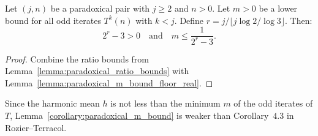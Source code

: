 \begin{corollary}\label{corollary:paradoxical_m_bound}\leanok
Let $(j, n)$ be a paradoxical pair with $j \ge 2$ and $n > 0$. Let $m > 0$ be a lower bound for all odd iterates $T^k(n)$ with $k < j$. Define $r = j / \lfloor j \log 2 / \log 3 \rfloor$. Then:
\begin{equation}
    2^r - 3 > 0 \quad \text{and} \quad m \le \frac{1}{2^r - 3}.
\end{equation}
\end{corollary}
\begin{proof}\leanok
Combine the ratio bounds from Lemma~\ref{lemma:paradoxical_ratio_bounds} with Lemma~\ref{lemma:paradoxical_m_bound_floor_real}.
\end{proof}

  Since the harmonic mean $h$ is not less than the minimum $m$ of the odd iterates of $T$,
  Lemma~\ref{corollary:paradoxical_m_bound} is weaker than Corollary~$4.3$ in Rozier--Terracol.
